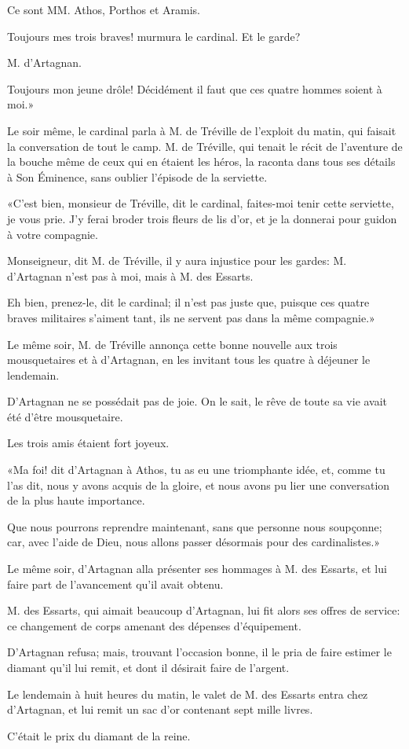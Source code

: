 \speak  Ce sont MM. Athos, Porthos et Aramis. 

\speak  Toujours mes trois braves! murmura le cardinal. Et le garde? 

\speak  M. d'Artagnan. 

\speak  Toujours mon jeune drôle! Décidément il faut que ces quatre hommes soient à moi.» 

Le soir même, le cardinal parla à M. de Tréville de l'exploit du matin, qui faisait la conversation de tout le camp. M. de Tréville, qui tenait le récit de l'aventure de la bouche même de ceux qui en étaient les héros, la raconta dans tous ses détails à Son Éminence, sans oublier l'épisode de la serviette. 

«C'est bien, monsieur de Tréville, dit le cardinal, faites-moi tenir cette serviette, je vous prie. J'y ferai broder trois fleurs de lis d'or, et je la donnerai pour guidon à votre compagnie. 

\speak  Monseigneur, dit M. de Tréville, il y aura injustice pour les gardes: M. d'Artagnan n'est pas à moi, mais à M. des Essarts. 

\speak  Eh bien, prenez-le, dit le cardinal; il n'est pas juste que, puisque ces quatre braves militaires s'aiment tant, ils ne servent pas dans la même compagnie.» 

Le même soir, M. de Tréville annonça cette bonne nouvelle aux trois mousquetaires et à d'Artagnan, en les invitant tous les quatre à déjeuner le lendemain. 

D'Artagnan ne se possédait pas de joie. On le sait, le rêve de toute sa vie avait été d'être mousquetaire. 

Les trois amis étaient fort joyeux. 

«Ma foi! dit d'Artagnan à Athos, tu as eu une triomphante idée, et, comme tu l'as dit, nous y avons acquis de la gloire, et nous avons pu lier une conversation de la plus haute importance. 

\speak  Que nous pourrons reprendre maintenant, sans que personne nous soupçonne; car, avec l'aide de Dieu, nous allons passer désormais pour des cardinalistes.» 

Le même soir, d'Artagnan alla présenter ses hommages à M. des Essarts, et lui faire part de l'avancement qu'il avait obtenu. 

M. des Essarts, qui aimait beaucoup d'Artagnan, lui fit alors ses offres de service: ce changement de corps amenant des dépenses d'équipement. 

D'Artagnan refusa; mais, trouvant l'occasion bonne, il le pria de faire estimer le diamant qu'il lui remit, et dont il désirait faire de l'argent. 

Le lendemain à huit heures du matin, le valet de M. des Essarts entra chez d'Artagnan, et lui remit un sac d'or contenant sept mille livres. 

C'était le prix du diamant de la reine. 